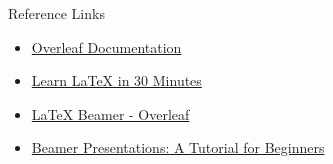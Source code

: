 \documentclass{beamer}
\begin{document}
\begin{frame}{Reference Links}
    \begin{itemize}
        \item \href{https://www.overleaf.com/learn}{Overleaf Documentation}
        \item \href{https://www.overleaf.com/learn/latex/Learn_LaTeX_in_30_minutes}{Learn LaTeX in 30 Minutes}
        \item \href{https://www.overleaf.com/learn/latex/Beamer}{LaTeX Beamer - Overleaf}
        \item \href{https://www.overleaf.com/learn/latex/Beamer_Presentations:_A_Tutorial_for_Beginners_(Part_1)\%E2\%80\%94Getting_Started}{Beamer Presentations: A Tutorial for Beginners}
    \end{itemize}
\end{frame}
\end{document}
